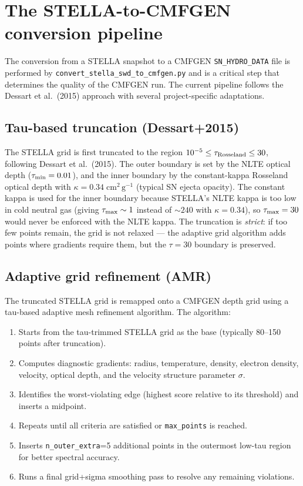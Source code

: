\documentclass[11pt]{article}
\begin{document}
\section{The STELLA-to-CMFGEN conversion pipeline}
\label{sec:conversion}

The conversion from a STELLA snapshot to a CMFGEN \texttt{SN\_HYDRO\_DATA}
file is performed by \texttt{convert\_stella\_swd\_to\_cmfgen.py} and
is a critical step that determines the quality of the CMFGEN run.  The
current pipeline follows the Dessart et al.\ (2015) approach with
several project-specific adaptations.

\subsection{Tau-based truncation (Dessart+2015)}

The STELLA grid is first truncated to the region
$10^{-5} \le \tau_{\rm Rosseland} \le 30$, following Dessart et al.\
(2015).  The outer boundary is set by the NLTE optical depth
($\tau_{\rm min} = 0.01$), and the inner boundary by the
constant-kappa Rosseland optical depth with $\kappa = 0.34\;\mathrm{cm^2\,g^{-1}}$
(typical SN ejecta opacity).  The constant kappa is used for the inner
boundary because STELLA's NLTE kappa is too low in cold neutral gas
(giving $\tau_{\rm max} \sim 1$ instead of $\sim 240$ with
$\kappa = 0.34$), so $\tau_{\rm max} = 30$ would never be enforced with
the NLTE kappa.  The truncation is \emph{strict}: if too few points
remain, the grid is not relaxed --- the adaptive grid algorithm adds
points where gradients require them, but the $\tau = 30$ boundary is
preserved.

\subsection{Adaptive grid refinement (AMR)}

The truncated STELLA grid is remapped onto a CMFGEN depth grid using a
tau-based adaptive mesh refinement algorithm.  The algorithm:

\begin{enumerate}[nosep]
  \item Starts from the tau-trimmed STELLA grid as the base (typically
        80--150 points after truncation).
  \item Computes diagnostic gradients: radius, temperature, density,
        electron density, velocity, optical depth, and the velocity
        structure parameter $\sigma$.
  \item Identifies the worst-violating edge (highest score relative to
        its threshold) and inserts a midpoint.
  \item Repeats until all criteria are satisfied or \texttt{max\_points}
        is reached.
  \item Inserts \texttt{n\_outer\_extra}=5 additional points in the
        outermost low-tau region for better spectral accuracy.
  \item Runs a final grid+sigma smoothing pass to resolve any remaining
        violations.
\end{enumerate}
\end{document}
